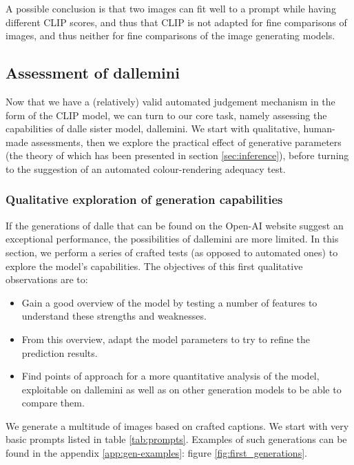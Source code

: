 \documentclass{article}
\begin{document}
\begin{multicols}{2}
A possible conclusion is that two images can fit well to a prompt while having different CLIP scores, and thus that CLIP is not adapted for fine comparisons of images, and thus neither for fine comparisons of the image generating models. 

\subsection{Assessment of \gls{dallemini}}

Now that we have a (relatively) valid automated judgement mechanism in the form of the CLIP model, we can turn to our core task, namely assessing the capabilities of \gls{dalle} sister model, \gls{dallemini}. We start with qualitative, human-made assessments, then we explore the practical effect of generative parameters (the theory of which has been presented in section \ref{sec:inference}), before turning to the suggestion of an automated colour-rendering adequacy test.

\subsubsection{Qualitative exploration of generation capabilities}\label{subsubsection:qualitativegeneration}

If the generations of \gls{dalle} that can be found on the Open-AI website suggest an exceptional performance, the possibilities of \gls{dallemini} are more limited. In this section, we perform a series of crafted tests (as opposed to automated ones) to explore the model's capabilities. The objectives of this first qualitative observations are to:

\begin{itemize}
    \item Gain a good overview of the model by testing a number of features to understand these strengths and weaknesses.
    \item From this overview, adapt the model parameters to try to refine the prediction results. 
    \item Find points of approach for a more quantitative analysis of the model, exploitable on \gls{dallemini} as well as on other generation models to be able to compare them.
\end{itemize}

We generate a multitude of images based on crafted captions. We start with very basic prompts listed in table \ref{tab:prompts}. Examples of such generations can be found in the appendix \ref{app:gen-examples}: figure \ref{fig:first_generations}.


\end{multicols}
\end{document}
